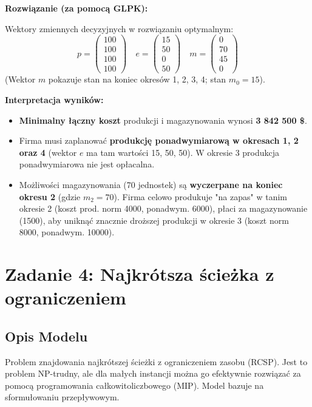 \documentclass[11pt, a4paper]{article}
\begin{document}
\bigskip
\noindent \textbf{Rozwiązanie (za pomocą GLPK):}

Wektory zmiennych decyzyjnych w rozwiązaniu optymalnym:
$$ p = \begin{pmatrix} 100 \\ 100 \\ 100 \\ 100 \end{pmatrix} \quad
   e = \begin{pmatrix} 15 \\ 50 \\ 0 \\ 50 \end{pmatrix} \quad
   m = \begin{pmatrix} 0 \\ 70 \\ 45 \\ 0 \end{pmatrix}
$$
(Wektor $m$ pokazuje stan na koniec okresów 1, 2, 3, 4; stan $m_0=15$).

\noindent \textbf{Interpretacja wyników:}
\begin{itemize}
    \item[ (a)] \textbf{Minimalny łączny koszt} produkcji i magazynowania wynosi \textbf{3 842 500 \$}.
    \item[ (b)] Firma musi zaplanować \textbf{produkcję ponadwymiarową w okresach 1, 2 oraz 4} (wektor $e$ ma tam wartości 15, 50, 50). W okresie 3 produkcja ponadwymiarowa nie jest opłacalna.
    \item[ (c)] Możliwości magazynowania (70 jednostek) są \textbf{wyczerpane na koniec okresu 2} (gdzie $m_2 = 70$). Firma celowo produkuje "na zapas" w tanim okresie 2 (koszt prod. norm 4000, ponadwym. 6000), płaci za magazynowanie (1500), aby uniknąć znacznie droższej produkcji w okresie 3 (koszt norm 8000, ponadwym. 10000).
\end{itemize}


\section{Zadanie 4: Najkrótsza ścieżka z ograniczeniem}

\subsection{Opis Modelu}
Problem znajdowania najkrótszej ścieżki z ograniczeniem zasobu (RCSP). Jest to problem NP-trudny, ale dla małych instancji można go efektywnie rozwiązać za pomocą programowania całkowitoliczbowego (MIP). Model bazuje na sformułowaniu przepływowym.
\end{document}
